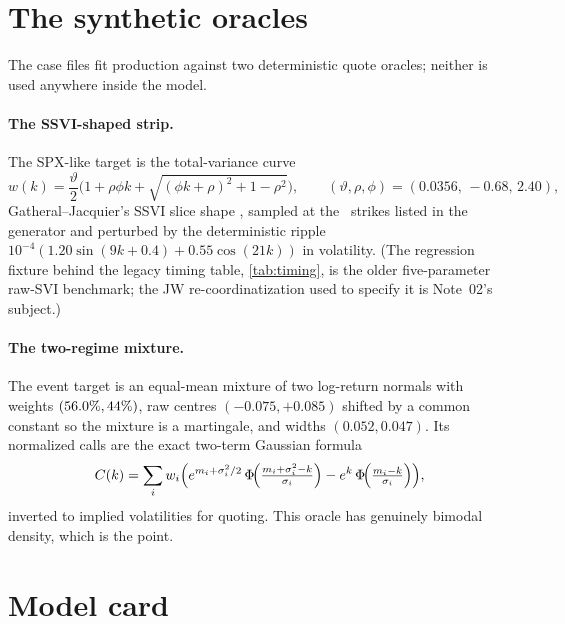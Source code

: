 \documentclass[11pt]{article}
\begin{document}
\section{The synthetic oracles}
\label{app:oracles}

The case files fit production against two deterministic quote oracles;
neither is used anywhere inside the model.

\paragraph{The SSVI-shaped strip.}  The SPX-like target is the total-variance
curve
\begin{equation}
w(k)=\frac{\vartheta}{2}\Big(1+\rho\phi k
+\sqrt{(\phi k+\rho)^{2}+1-\rho^{2}}\Big),
\qquad
(\vartheta,\rho,\phi)=(0.0356,\,-0.68,\,2.40),
\end{equation}
Gatheral--Jacquier's SSVI slice shape \cite{GatheralJacquier2014},
sampled at the \lqdfreshspxnquotes\ strikes listed in the generator and
perturbed by the deterministic ripple
$10^{-4}(1.20\sin(9k+0.4)+0.55\cos(21k))$ in volatility.  (The regression
fixture behind the legacy timing table, \cref{tab:timing}, is the older
five-parameter raw-SVI benchmark; the JW re-coordinatization used to specify
it is Note~02's subject.)

\paragraph{The two-regime mixture.}  The event target is an equal-mean
mixture of two log-return normals with weights
$(56.0\%,44\%)$, raw centres $(-0.075,+0.085)$ shifted by
a common constant so the mixture is a martingale, and widths
$(0.052,0.047)$.  Its normalized calls are the exact two-term Gaussian
formula
\begin{equation}
C(k)=\sum_{i}w_i\Big(
e^{m_i+\sigma_i^{2}/2}\,
\Phi\!\Big(\tfrac{m_i+\sigma_i^{2}-k}{\sigma_i}\Big)
-e^{k}\,\Phi\!\Big(\tfrac{m_i-k}{\sigma_i}\Big)\Big),
\end{equation}
inverted to implied volatilities for quoting.  This oracle has genuinely
bimodal density, which is the point.

\section{Model card}
\label{app:card}
\end{document}
